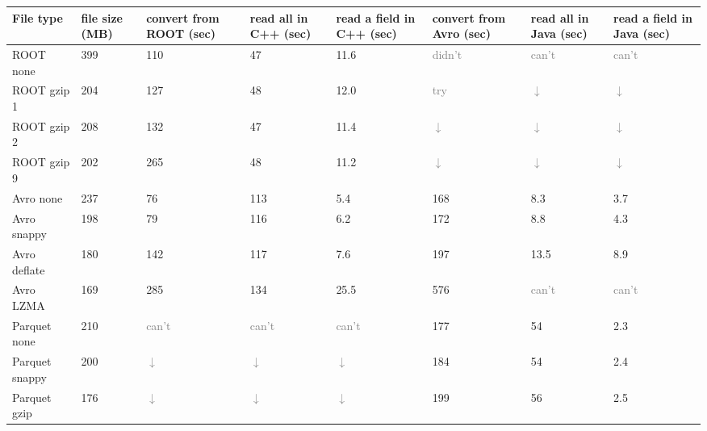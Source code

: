 \documentclass{article}
\begin{document}
\noindent\begin{tabular}{p{2.4 cm} | P{1.2 cm} P{1.9 cm} P{1.2 cm} P{1.8 cm} P{1.9 cm} P{1.2 cm} P{1.6 cm}}
File type & file size (MB) & convert from ROOT (sec) & read all in C++ (sec) & read a field in C++ (sec) & convert from Avro (sec) & read all in Java (sec) & read a field in Java (sec)      \\\hline
ROOT none     & 399 &          110 &           47 &         11.6 &       \textcolor{gray}{didn't} &        \textcolor{gray}{can't} &        \textcolor{gray}{can't} \\
ROOT gzip 1   & 204 &          127 &           48 &         12.0 &          \textcolor{gray}{try} & \textcolor{gray}{$\downarrow$} & \textcolor{gray}{$\downarrow$} \\
ROOT gzip 2   & 208 &          132 &           47 &         11.4 & \textcolor{gray}{$\downarrow$} & \textcolor{gray}{$\downarrow$} & \textcolor{gray}{$\downarrow$} \\
ROOT gzip 9   & 202 &          265 &           48 &         11.2 & \textcolor{gray}{$\downarrow$} & \textcolor{gray}{$\downarrow$} & \textcolor{gray}{$\downarrow$} \\\hline
Avro none     & 237 &           76 &          113 &          5.4 &          168 &          8.3 &          3.7 \\
Avro snappy   & 198 &           79 &          116 &          6.2 &          172 &          8.8 &          4.3 \\
Avro deflate  & 180 &          142 &          117 &          7.6 &          197 &         13.5 &          8.9 \\
Avro LZMA     & 169 &          285 &          134 &         25.5 &          576 &        \textcolor{gray}{can't} &        \textcolor{gray}{can't} \\\hline
Parquet none  & 210 &        \textcolor{gray}{can't} &        \textcolor{gray}{can't} &        \textcolor{gray}{can't} &          177 &           54 &          2.3 \\
Parquet snappy  & 200 & \textcolor{gray}{$\downarrow$} & \textcolor{gray}{$\downarrow$} & \textcolor{gray}{$\downarrow$} &          184 &           54 &          2.4 \\
Parquet gzip  & 176 & \textcolor{gray}{$\downarrow$} & \textcolor{gray}{$\downarrow$} & \textcolor{gray}{$\downarrow$} &          199 &           56 &          2.5 \\
\end{tabular}
\end{document}

